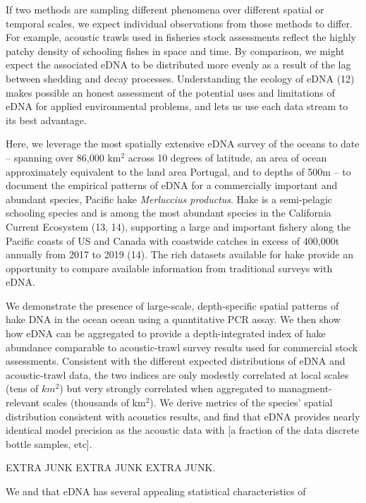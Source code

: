 \documentclass[
]{article}
\begin{document}
If two methods are sampling different phenomena over different spatial
or temporal scales, we expect individual observations from those methods
to differ. For example, acoustic trawls used in fisheries stock
assessments reflect the highly patchy density of schooling fishes in
space and time. By comparison, we might expect the associated eDNA to be
distributed more evenly as a result of the lag between shedding and
decay processes. Understanding the ecology of eDNA (12) makes possible
an honest assessment of the potential uses and limitations of eDNA for
applied environmental problems, and lets us use each data stream to its
best advantage.

Here, we leverage the most spatially extensive eDNA survey of the oceans
to date -- spanning over 86,000 km\(^2\) across 10 degrees of latitude,
an area of ocean approximately equivalent to the land area Portugal, and
to depths of 500m -- to document the empirical patterns of eDNA for a
commercially important and abundant species, Pacific hake
\emph{Merluccius productus}. Hake is a semi-pelagic schooling species
and is among the most abundant species in the California Current
Ecosystem (13, 14), supporting a large and important fishery along the
Pacific coasts of US and Canada with coastwide catches in excess of
400,000t annually from 2017 to 2019 (14). The rich datasets available
for hake provide an opportunity to compare available information from
traditional surveys with eDNA.

We demonstrate the presence of large-scale, depth-specific spatial
patterns of hake DNA in the ocean ocean using a quantitative PCR assay.
We then show how eDNA can be aggregated to provide a depth-integrated
index of hake abundance comparable to acoustic-trawl survey results used
for commercial stock assessments. Consistent with the different expected
distributions of eDNA and acoustic-trawl data, the two indices are only
modestly correlated at local scales (tens of \(km^2\)) but very strongly
correlated when aggregated to managment-relevant scales (thousands of
km\(^2\)). We derive metrics of the species' spatial distribution
consistent with acoustics results, and find that eDNA provides nearly
identical model precision as the acoustic data with {[}a fraction of the
data \textbar{} discrete bottle samples, etc{]}.

\clearpage

EXTRA JUNK EXTRA JUNK EXTRA JUNK.

We and that eDNA has several appealing statistical characteristics of
\end{document}
